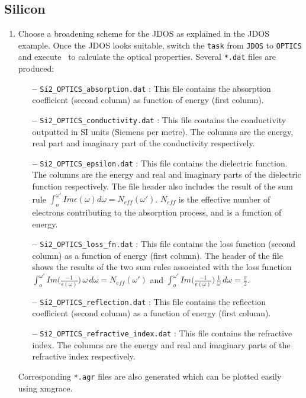 \documentclass[a4paper,11pt,twoside]{book}
\begin{document}
{\subsection{Silicon}
\begin{enumerate}
\item Choose a broadening scheme for the JDOS as explained in the JDOS example.  Once the JDOS looks suitable, switch the \verb#task# from \verb#JDOS# to \verb#OPTICS# and execute \optados\ to calculate the optical properties.  Several \verb#*.dat# files are produced:
\begin{itemize}
\item[{\bf --}] \verb#Si2_OPTICS_absorption.dat# : This file contains the absorption coefficient (second column) as function of energy (first column).
\item[{\bf --}] \verb#Si2_OPTICS_conductivity.dat# : This file contains the conductivity outputted in SI units (Siemens per metre).  The columns are the energy, real part  and imaginary part of the conductivity respectively.
\item[{\bf --}] \verb#Si2_OPTICS_epsilon.dat# : This file contains the dielectric function.  The columns are the energy and real and imaginary parts of the dielectric function respectively. The file header also includes the result of the sum rule $\int_o^{\omega'}Im\epsilon{}(\omega{})d\omega = N_{eff}(\omega')$.  $N_{eff}$ is the effective number of electrons contributing to the absorption process, and is a function of energy.
\item[{\bf --}] \verb#Si2_OPTICS_loss_fn.dat# : This file contains the loss function (second column) as a function of energy (first column).  The header of the file shows the results of the two sum rules associated with the loss function $\int_o^{\omega'}Im\Big(\frac{-1}{\epsilon{}(\omega{})}\Big)\,\omega{}\,d\omega = N_{eff}(\omega')$ and $\int_o^{\omega'}Im\Big(\frac{-1}{\epsilon{}(\omega{})}\Big)\,\frac{1}{\omega}\,d\omega = \frac{\pi}{2}$.
\item[{\bf --}] \verb#Si2_OPTICS_reflection.dat# : This file contains the reflection coefficient (second column) as a function of energy (first column).
\item[{\bf --}] \verb#Si2_OPTICS_refractive_index.dat# : This file contains the refractive index.  The columns are the energy and real and imaginary parts of the refractive index respectively.
\end{itemize}
Corresponding \verb#*.agr# files are also generated which can be plotted easily using xmgrace.


\end{enumerate}}
\end{document}
